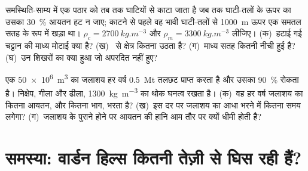 \begin{exercise}[$\star\star\star$]
\label{exo:b1:erosion-transport:11}
समस्थिति-साम्य में एक पठार को तब तक घाटियों से काटा जाता है जब तक घाटी-तलों के ऊपर का उसका \qty{30}{\percent} आयतन हट न जाए; काटने से पहले वह भावी घाटी-तलों से \qty{1000}{m} ऊपर एक समतल सतह के रूप में खड़ा था। $\rho_c = \qty{2700}{kg.m^{-3}}$ और $\rho_m = \qty{3300}{kg.m^{-3}}$ लीजिए। (क)~हटाई गई चट्टान की माध्य मोटाई क्या है? (ख)~ से क्षेत्र कितना उठता है? (ग)~माध्य सतह कितनी नीची हुई है? (घ)~उन शिखरों का क्या हुआ जो अपरदित नहीं हुए?
\end{exercise}

\begin{exercise}[$\star\star\star$]
\label{exo:b1:erosion-transport:12}
एक \qty{50e6}{m^3} का जलाशय हर वर्ष \qty{0.5}{Mt} तलछट प्राप्त करता है और उसका \qty{90}{\percent} रोकता है। निक्षेप, गीला और ढीला, \qty{1300}{kg.m^{-3}} का थोक घनत्व रखता है। (क)~वह हर वर्ष जलाशय का कितना आयतन, और कितना भाग, भरता है? (ख)~इस दर पर जलाशय का आधा भरने में कितना समय लगेगा? (ग)~जलाशय के पुराने होने पर आयतन की हानि आम तौर पर क्यों धीमी होती है?
\end{exercise}

\section{समस्या: वार्डन हिल्स कितनी तेज़ी से घिस रही हैं?}

